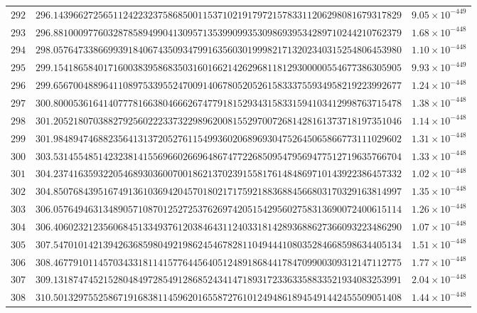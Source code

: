 \documentclass[12pt,reqno]{amsart}
\theoremstyle{remark}
\begin{document}
\begin{longtable}{clc}
$292$ & $296.1439662725651124223237586850011537102191797215783311206298081679317829$ & $9.05\times 10^{-449}$ \\
$293$ & $296.8810009776032878589499041309571353990993530986939534289710244210762379$ & $1.68\times 10^{-448}$ \\
$294$ & $298.0576473386699391840674350934799163560301999821713202340315254806453980$ & $1.10\times 10^{-448}$ \\
$295$ & $299.1541865840171600383958683503160166214262968118129300000554677386305905$ & $9.93\times 10^{-449}$ \\
$296$ & $299.6567004889641108975339552470091406780520526158333755934958219223992677$ & $1.24\times 10^{-448}$ \\
$297$ & $300.8000536164140777816638046662674779181529343158331594103412998763715478$ & $1.38\times 10^{-448}$ \\
$298$ & $301.2052180703882792560222337322989620081552970072681428161373718197351046$ & $1.14\times 10^{-448}$ \\
$299$ & $301.9848947468823564131372052761154993602068969304752645065866773111029602$ & $1.31\times 10^{-448}$ \\
$300$ & $303.5314554851423238141556966026696486747722685095479569477512719635766704$ & $1.33\times 10^{-448}$ \\
$301$ & $304.2374163593220546893036007001862137023915581761484869710143922386457332$ & $1.02\times 10^{-448}$ \\
$302$ & $304.8507684395167491361036942045701802171759218836884566803170329163814997$ & $1.35\times 10^{-448}$ \\
$303$ & $306.0576494631348905710870125272537626974205154295602758313690072400615114$ & $1.26\times 10^{-448}$ \\
$304$ & $306.4060232123560684513349376120384643112403318142893688627366093223486290$ & $1.07\times 10^{-448}$ \\
$305$ & $307.5470101421394263685980492198624546782811049444108035284668598634405134$ & $1.51\times 10^{-448}$ \\
$306$ & $308.4677910114570343318114157764456405124891868441784709900309312147112775$ & $1.77\times 10^{-448}$ \\
$307$ & $309.1318747452152804849728549128685243414718931723363358833521934083253991$ & $2.04\times 10^{-448}$ \\
$308$ & $310.5013297552586719168381145962016558727610124948618945491442455509051408$ & $1.44\times 10^{-448}$ \\

\end{longtable}
\end{document}

